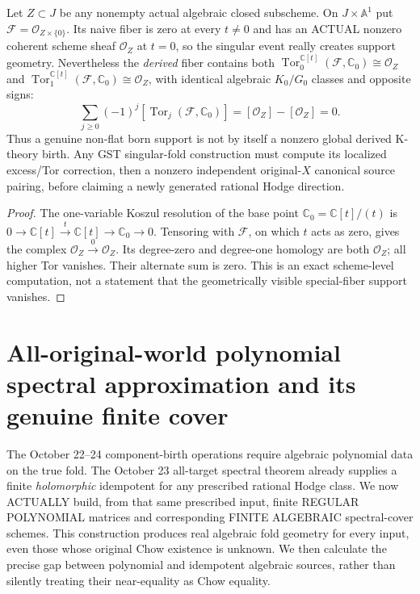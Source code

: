 \documentclass[11pt]{article}
\begin{document}
\begin{proposition}
Let $Z\subset J$ be any nonempty actual algebraic
closed subscheme. On $J\times\mathbb A^1$ put
$\mathcal F=\mathcal O_{Z\times\{0\}}$.
Its naive fiber is zero at every $t\ne0$ and has
an ACTUAL nonzero coherent scheme sheaf
$\mathcal O_Z$ at $t=0$, so the singular event really
creates support geometry. Nevertheless the
\emph{derived} fiber contains both
$\operatorname{Tor}_0^{\mathbb C[t]}(\mathcal F,\mathbb C_0)
\cong\mathcal O_Z$ and
$\operatorname{Tor}_1^{\mathbb C[t]}(\mathcal F,\mathbb C_0)
\cong\mathcal O_Z$, with identical algebraic
$K_0/G_0$ classes and opposite signs:
\[
 \boxed{
 \sum_{j\ge0}(-1)^j
 [\operatorname{Tor}_j(\mathcal F,\mathbb C_0)]
  =[\mathcal O_Z]-[\mathcal O_Z]=0 .}                     \tag{38}
\]
Thus a genuine non-flat born support is not by
itself a nonzero global derived K-theory birth.
Any GST singular-fold construction must compute
its localized excess/Tor correction, then a
nonzero independent original-$X$ canonical
source pairing, before claiming a newly
generated rational Hodge direction.
\end{proposition}
\begin{proof}
The one-variable Koszul resolution of the base
point $\mathbb C_0=\mathbb C[t]/(t)$ is
$0\to\mathbb C[t]\xrightarrow{t}\mathbb C[t]\to
 \mathbb C_0\to0$.
Tensoring with $\mathcal F$, on which $t$ acts
as zero, gives the complex
$\mathcal O_Z\xrightarrow{0}\mathcal O_Z$.
Its degree-zero and degree-one homology
are both $\mathcal O_Z$; all higher Tor
vanishes. Their alternate sum is zero.
This is an exact scheme-level computation,
not a statement that the geometrically
visible special-fiber support vanishes.
\end{proof}



\section{All-original-world polynomial spectral approximation and its genuine finite cover}
The October 22--24 component-birth operations require algebraic
polynomial data on the true fold. The October 23 all-target spectral
theorem already supplies a finite \emph{holomorphic} idempotent for any
prescribed rational Hodge class. We now ACTUALLY build, from that
same prescribed input, finite REGULAR POLYNOMIAL matrices and
corresponding FINITE ALGEBRAIC spectral-cover schemes.
This construction produces real algebraic fold geometry for every
input, even those whose original Chow existence is unknown.
We then calculate the precise gap between polynomial and
idempotent algebraic sources, rather than silently treating
their near-equality as Chow equality.
\end{document}
